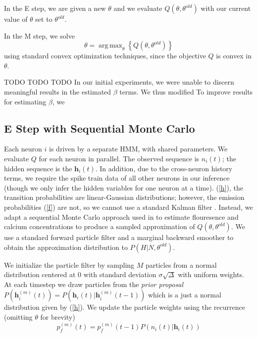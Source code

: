 \documentclass{article}
\DeclareMathOperator*{\argmax}{arg\,max}
\begin{document}
In the E step, we are given a new $\theta$ and we evaluate
$Q(\theta,\theta^{old})$ with our current value of $\theta$
set to $\theta^{old}$.

In the M step, we solve
\begin{equation}
\label{M} \theta = \argmax_{\theta} \left\{ Q(\theta,\theta^{old}) \right\}
\end{equation}
using standard convex optimization techniques, since the objective $Q$ is
convex in $\theta$.

TODO TODO TODO
In our initial experiments, we were unable to discern meaningful results
in the estimated $\beta$ terms. We thus modified 
To improve results for estimating $\beta$, we 

\subsection{E Step with Sequential Monte Carlo}
Each neuron $i$ is driven by a separate HMM, with shared parameters.
We evaluate $Q$ for each neuron in parallel.  The observed sequence
is $n_i(t)$; the hidden sequence is the $\mathbf{h}_i(t)$. In
addition, due to the cross-neuron history terms, we require the
spike train data of all other neurons in our inference (though we
only infer the hidden variables for one neuron at a time).  (\ref{h}),
the transition probabilities are linear-Gaussian distributions;
however, the emission probabilities (\ref{f}) are not, so we cannot
use a standard Kalman filter \citep{bishop}.  Instead, we adapt a
sequential Monte Carlo approach used in \citep{volgelstein2009,
mishchencko2011} to estimate flouresence and calcium concentrations
to produce a sampled approximation of $Q(\theta,\theta^{old})$. We
use a standard forward particle filter \citep{bishop} and a marginal
backward smoother \citep{doucet2000} to obtain the approximation
distribution to $P(H|N,\theta^{old})$.

We initialize the particle filter by sampling $M$ particles from a
normal distribution centered at 0 with standard deviation
$\sigma\sqrt{\Delta}$ with uniform weights. At each timestep we draw
particles from the \emph{prior proposal}
$P(\mathbf{h}_i^{(m)}(t)) = P(\mathbf{h}_i(t) | \mathbf{h}_i^{(m)}(t - 1))$
which is a just a normal distribution given by (\ref{h}). We update
the particle weights using the recurrence (omitting $\theta$ for brevity)
\begin{equation} \label{pf}
p_f^{(m)}(t) = p_f^{(m)}(t - 1)P(n_i(t) | \mathbf{h}_i(t)) 
\end{equation}
\end{document}
